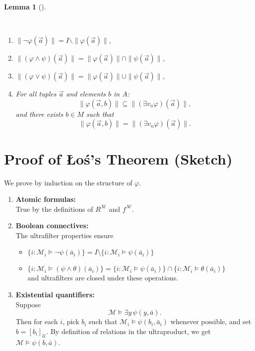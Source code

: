 \documentclass[
]{article}
\providecommand{\tightlist}{%
  \setlength{\itemsep}{0pt}\setlength{\parskip}{0pt}}
\theoremstyle{definition}
\theoremstyle{plain}
\theoremstyle{plain}
\newtheorem{lemma}{Lemma}[section]
\theoremstyle{remark}
\begin{document}
\begin{lemma}[]\protect\hypertarget{lem-}{}\label{lem-}

~

\begin{enumerate}
\def\labelenumi{\arabic{enumi}.}
\tightlist
\item
  \(\| \neg \varphi(\vec{a}) \| = I \backslash \|\varphi(\vec{a}) \|\),
\item
  \(\| (\varphi \wedge \psi)(\vec{a}) \| =\| \varphi(\vec{a}) \| \cap \| \psi(\vec{a}) \|\),
\item
  \(\| (\varphi \vee \psi)(\vec{a}) \| =\| \varphi(\vec{a}) \| \cup \| \psi(\vec{a}) \|\),
\item
  For all tuples \(\vec{a}\) and elements \(b\) in \(A\): \[
  \|\varphi(\vec{a},b) \| \subseteq \| (\exists v_n \varphi)(\vec{a}) \|,
  \] and there exists \(b \in M\) such that \[
  \|\varphi(\vec{a},b) \| = \| (\exists v_n \varphi)(\vec{a}) \|.
  \]
\end{enumerate}

\end{lemma}

\section{Proof of Łoś's Theorem
(Sketch)}\label{proof-of-ux142oux15bs-theorem-sketch}

We prove by induction on the structure of \(\varphi\).

\begin{enumerate}
\def\labelenumi{\arabic{enumi}.}
\item
  \textbf{Atomic formulas:}\\
  True by the definitions of \(R^{\mathcal{M}}\) and
  \(f^{\mathcal{M}}\).
\item
  \textbf{Boolean connectives:}\\
  The ultrafilter properties ensure

  \begin{itemize}
  \tightlist
  \item
    \(\{ i : \mathcal{M}_i \models \neg\psi(\bar a_i)\} = I \setminus \{ i : \mathcal{M}_i \models \psi(\bar a_i)\}\)\\
  \item
    \(\{ i : \mathcal{M}_i \models (\psi \wedge \theta)(\bar a_i)\}
     = \{ i : \mathcal{M}_i \models \psi(\bar a_i)\}
       \cap \{ i : \mathcal{M}_i \models \theta(\bar a_i)\}\)\\
    and ultrafilters are closed under these operations.
  \end{itemize}
\item
  \textbf{Existential quantifiers:}\\
  Suppose \[
  \mathcal{M} \models \exists y\, \psi(y,\bar a).
  \] Then for each \(i\), pick \(b_i\) such that
  \(\mathcal{M}_i \models \psi(b_i,\bar a_i)\) whenever possible, and
  set \(b = [b_i]_{\mathcal{U}}\). By definition of relations in the
  ultraproduct, we get \(\mathcal{M} \models \psi(b,\bar a)\).
\end{enumerate}
\end{document}
